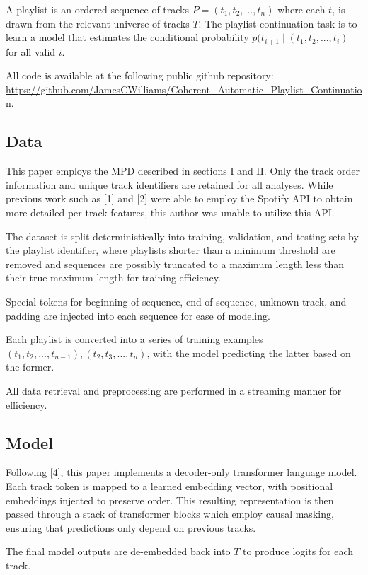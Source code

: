 \documentclass[conference]{IEEEtran}
\begin{document}
A playlist is an ordered sequence of tracks $P = (t_1, t_2, ..., t_n)$ where each $t_i$ is drawn from the relevant universe of tracks $T$. The playlist continuation task is to learn a model that estimates the conditional probability $p(t_{i+1} \mid (t_1, t_2, ..., t_i)$ for all valid $i$.

All code is available at the following public github repository: \url{https://github.com/JamesCWilliams/Coherent_Automatic_Playlist_Continuation}.

\subsection{Data}

This paper employs the MPD described in sections I and II. Only the track order information and unique track identifiers are retained for all analyses. While previous work such as [1] and [2] were able to employ the Spotify API to obtain more detailed per-track features, this author was unable to utilize this API.

The dataset is split deterministically into training, validation, and testing sets by the playlist identifier, where playlists shorter than a minimum threshold are removed and sequences are possibly truncated to a maximum length less than their true maximum length for training efficiency.

Special tokens for beginning-of-sequence, end-of-sequence, unknown track, and padding are injected into each sequence for ease of modeling. 

Each playlist is converted into a series of training examples $(t_1, t_2, ..., t_{n-1}), (t_2, t_3, ..., t_n)$, with the model predicting the latter based on the former.

All data retrieval and preprocessing are performed in a streaming manner for efficiency.

\subsection{Model}

Following [4], this paper implements a decoder-only transformer language model. Each track token is mapped to a learned embedding vector, with positional embeddings injected to preserve order. This resulting representation is then passed through a stack of transformer blocks which employ causal masking, ensuring that predictions only depend on previous tracks.

The final model outputs are de-embedded back into $T$ to produce logits for each track. 
\end{document}
